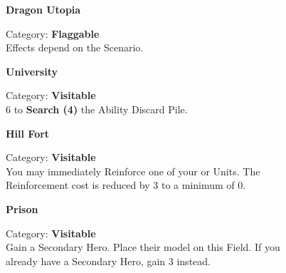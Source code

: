 \begin{figure}[H]
  \begin{minipage}[t]{0.47\textwidth}
    \vspace{0pt}
    \centering
    \textbf{Dragon Utopia}\par
    \caption{\small Category: \textbf{Flaggable}\\Effects depend on the Scenario.}
  \end{minipage}\hfill
  \begin{minipage}[t]{0.47\textwidth}
    \vspace{0pt}
    \centering
    \textbf{University}\par
    \caption{\small Category: \textbf{Visitable}\\
       6  to \textbf{Search (4)} the Ability Discard Pile.}
  \end{minipage}
\end{figure}

\begin{figure}[H]
  \begin{minipage}[t]{0.47\textwidth}
    \vspace{0pt}
    \centering
    \phantom{j}\textbf{Hill Fort}\par
    \caption{\small Category: \textbf{Visitable}\\
      You may immediately Reinforce one of your  or  Units.
      The Reinforcement cost is reduced by 3  to a minimum of 0.}
  \end{minipage}\hfill
  \begin{minipage}[t]{0.47\textwidth}
    \vspace{0pt}
    \centering
    \phantom{j}\textbf{Prison}\par
    \caption{\small Category: \textbf{Visitable}\\
      Gain a Secondary Hero.
      Place their model on this Field.
      If you already have a Secondary Hero, gain 3  instead.}
  \end{minipage}
\end{figure}

